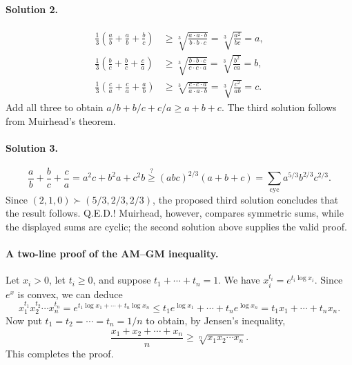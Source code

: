 \documentclass[11pt,a4paper]{article}
\begin{document}
\paragraph{Solution 2.}
\[
\begin{aligned}
\frac13\left(\frac ab+\frac ab+\frac bc\right)&\geq\sqrt[3]{\frac{a\cdot a\cdot b}{b\cdot b\cdot c}}=\sqrt[3]{\frac{a^2}{bc}}=a,\\
\frac13\left(\frac bc+\frac bc+\frac ca\right)&\geq\sqrt[3]{\frac{b\cdot b\cdot c}{c\cdot c\cdot a}}=\sqrt[3]{\frac{b^2}{ca}}=b,\\
\frac13\left(\frac ca+\frac ca+\frac ab\right)&\geq\sqrt[3]{\frac{c\cdot c\cdot a}{a\cdot a\cdot b}}=\sqrt[3]{\frac{c^2}{ab}}=c.
\end{aligned}
\]
Add all three to obtain $a/b+b/c+c/a\geq a+b+c$.
The third solution follows from Muirhead's theorem.
\paragraph{Solution 3.}
\[\frac ab+\frac bc+\frac ca=a^2c+b^2a+c^2b
\mathrel{\stackrel{?}{\geq}}(abc)^{2/3}(a+b+c)
=\sum_{\mathrm{cyc}}a^{5/3}b^{2/3}c^{2/3}.\]
Since $(2,1,0)\succ(5/3,2/3,2/3)$, the proposed third solution concludes that the result follows. Q.E.D.!
Muirhead, however, compares symmetric sums, while the displayed sums are cyclic;
the second solution above supplies the valid proof.

\paragraph{A two-line proof of the AM--GM inequality.}
Let $x_i>0$, let $t_i\geq0$, and suppose $t_1+\cdots+t_n=1$.
We have $x_i^{t_i}=e^{t_i\log x_i}$. Since $e^x$ is convex, we can deduce
\[x_1^{t_1}x_2^{t_2}\cdots x_n^{t_n}
=e^{t_1\log x_1+\cdots+t_n\log x_n}
\leq t_1e^{\log x_1}+\cdots+t_ne^{\log x_n}=t_1x_1+\cdots+t_nx_n.\]
Now put $t_1=t_2=\cdots=t_n=1/n$ to obtain, by Jensen's inequality,
\[\frac{x_1+x_2+\cdots+x_n}{n}\geq\sqrt[n]{x_1x_2\cdots x_n}.\]
This completes the proof.
\end{document}
